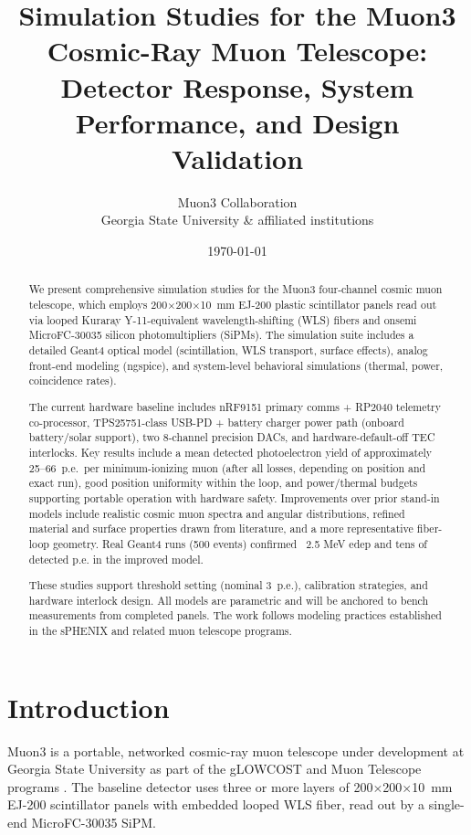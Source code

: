 \documentclass[11pt,a4paper]{article}
\title{\textbf{Simulation Studies for the Muon3 Cosmic-Ray Muon Telescope:\\
Detector Response, System Performance, and Design Validation}}
\author{
  Muon3 Collaboration\\
  Georgia State University \& affiliated institutions
}
\date{\today}
\begin{document}
\maketitle

\begin{abstract}
We present comprehensive simulation studies for the Muon3 four-channel cosmic muon telescope, which employs 200$\times$200$\times$10~mm EJ-200 plastic scintillator panels read out via looped Kuraray Y-11-equivalent wavelength-shifting (WLS) fibers and onsemi MicroFC-30035 silicon photomultipliers (SiPMs). The simulation suite includes a detailed Geant4 optical model (scintillation, WLS transport, surface effects), analog front-end modeling (ngspice), and system-level behavioral simulations (thermal, power, coincidence rates). 

The current hardware baseline includes nRF9151 primary comms + RP2040 telemetry co-processor, TPS25751-class USB-PD + battery charger power path (onboard battery/solar support), two 8-channel precision DACs, and hardware-default-off TEC interlocks. Key results include a mean detected photoelectron yield of approximately 25--66~p.e.\ per minimum-ionizing muon (after all losses, depending on position and exact run), good position uniformity within the loop, and power/thermal budgets supporting portable operation with hardware safety. Improvements over prior stand-in models include realistic cosmic muon spectra and angular distributions, refined material and surface properties drawn from literature, and a more representative fiber-loop geometry. Real Geant4 runs (500 events) confirmed ~2.5 MeV edep and tens of detected p.e. in the improved model.

These studies support threshold setting (nominal 3~p.e.), calibration strategies, and hardware interlock design. All models are parametric and will be anchored to bench measurements from completed panels. The work follows modeling practices established in the sPHENIX and related muon telescope programs.
\end{abstract}

\section{Introduction}
\label{sec:intro}

Muon3 is a portable, networked cosmic-ray muon telescope under development at Georgia State University as part of the gLOWCOST and Muon Telescope programs \cite{muontelescope,glowcost}. The baseline detector uses three or more layers of 200$\times$200$\times$10~mm EJ-200 scintillator panels with embedded looped WLS fiber, read out by a single-end MicroFC-30035 SiPM. 
\end{document}
